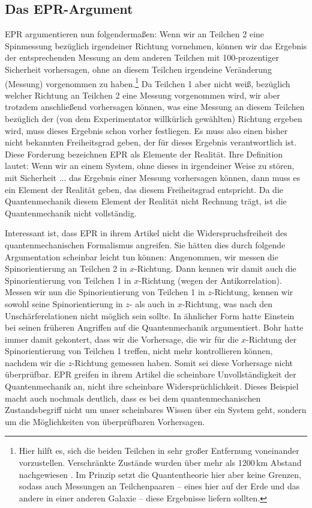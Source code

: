 \subsection{Das EPR-Argument}

EPR argumentieren nun folgenderma\ss en: Wenn wir an
Teilchen 2 eine Spinmessung bez\"uglich irgendeiner 
Richtung vornehmen, k\"onnen wir das Ergebnis der 
entsprechenden Messung an dem anderen Teilchen mit 
100-prozentiger Sicherheit vorhersagen, ohne an diesem
Teilchen irgendeine Ver\"anderung (Messung) vorgenommen 
zu haben.\footnote{Hier hilft es, sich die beiden Teilchen in sehr
gro\ss er Entfernung voneinander vorzustellen.
Verschr\"ankte Zust\"ande wurden \"uber mehr als 1200\,km  Abstand
nachgewiesen \cite{Yin}. Im Prinzip setzt die Quantentheorie hier aber keine
Grenzen, sodass auch Messungen an Teilchenpaaren -- eines hier 
auf der Erde und das andere in einer anderen Galaxie --
diese Ergebnisse liefern sollten.} Da Teilchen 1 aber nicht \glqq wei\ss\grqq, 
bez\"uglich welcher Richtung an Teilchen 2 eine
Messung vorgenommen wird, wir aber trotzdem anschlie\ss end
vorhersagen k\"onnen, was eine Messung an diesem Teilchen
bez\"uglich der (von dem Experimentator willk\"urlich gew\"ahlten) Richtung 
ergeben wird, muss dieses Ergebnis schon vorher festliegen.
Es muss also einen bisher nicht bekannten Freiheitsgrad
geben, der f\"ur dieses Ergebnis verantwortlich ist. Diese
Forderung bezeichnen EPR als \glqq Elemente
der Realit\"at\grqq. Ihre Definition lautet: \glqq Wenn wir an
einem Sys\-tem, ohne dieses in irgendeiner Weise zu st\"oren,
mit Sicherheit ... das Ergebnis einer Messung vorhersagen
k\"onnen, dann muss es ein Element der Realit\"at geben,
das diesem Freiheitsgrad entspricht\grqq. Da die
Quantenmechanik diesem Element der Realit\"at nicht
Rechnung tr\"agt, ist die Quantenmechanik nicht
vollst\"andig.

Interessant ist, dass EPR in ihrem Artikel nicht
die Widerspruchsfreiheit des quantenmechanischen
Formalismus angreifen. Sie h\"atten dies durch folgende
Argumentation scheinbar leicht tun k\"on\-nen:
Angenommen, wir messen die Spinorientierung an Teilchen
2 in $x$-Richtung. Dann kennen wir damit auch die
Spinorientierung von Teilchen 1 in $x$-Richtung (wegen der
Antikorrelation). Messen wir nun die Spinorientierung von
Teilchen 1 in $z$-Richtung, kennen wir sowohl seine
Spinorientierung in $z$- als auch in $x$-Richtung, was nach
den Unsch\"arferelationen nicht m\"oglich sein sollte.
In \"ahnlicher Form hatte Einstein bei seinen fr\"uheren
Angriffen auf die Quantenmechanik argumentiert.
Bohr hatte immer damit gekontert, dass wir die
Vorhersage, die wir f\"ur die $x$-Richtung der Spinorientierung
von Teilchen 1 treffen, nicht mehr kontrollieren k\"onnen,
nachdem wir die $z$-Richtung gemessen haben.
Somit sei diese Vorhersage nicht \"uberpr\"ufbar.
EPR greifen in ihrem Artikel die scheinbare 
Unvollst\"andigkeit der Quantenmechanik an, nicht 
ihre scheinbare Widerspr\"uchlichkeit. Dieses Beispiel macht auch
nochmals deutlich, dass es bei dem quantenmechanischen Zustandsbegriff
nicht um unser scheinbares Wissen \"uber ein System geht, sondern
um die M\"oglichkeiten von \"uberpr\"ufbaren Vorhersagen.

